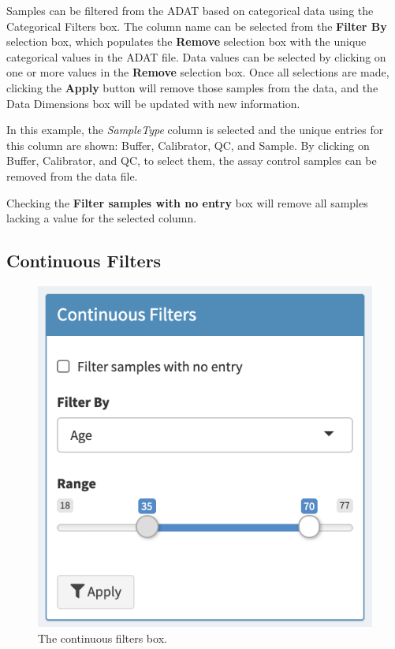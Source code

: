 \documentclass[
]{book}
\begin{document}
Samples can be filtered from the ADAT based on categorical data using the Categorical Filters box. The column name can be selected from the \textbf{Filter By} selection box, which populates the \textbf{Remove} selection box with the unique categorical values in the ADAT file. Data values can be selected by clicking on one or more values in the \textbf{Remove} selection box. Once all selections are made, clicking the \textbf{Apply} button will remove those samples from the data, and the Data Dimensions box will be updated with new information.

In this example, the \emph{SampleType} column is selected and the unique entries for this column are shown: Buffer, Calibrator, QC, and Sample. By clicking on Buffer, Calibrator, and QC, to select them, the assay control samples can be removed from the data file.

Checking the \textbf{Filter samples with no entry} box will remove all samples lacking a value for the selected column.

\hypertarget{continuous-filters}{%
\subsection{Continuous Filters}\label{continuous-filters}}

\begin{figure}
\centering
\includegraphics{images/ContinousFilters.png}
\caption{The continuous filters box.}
\end{figure}
\end{document}
